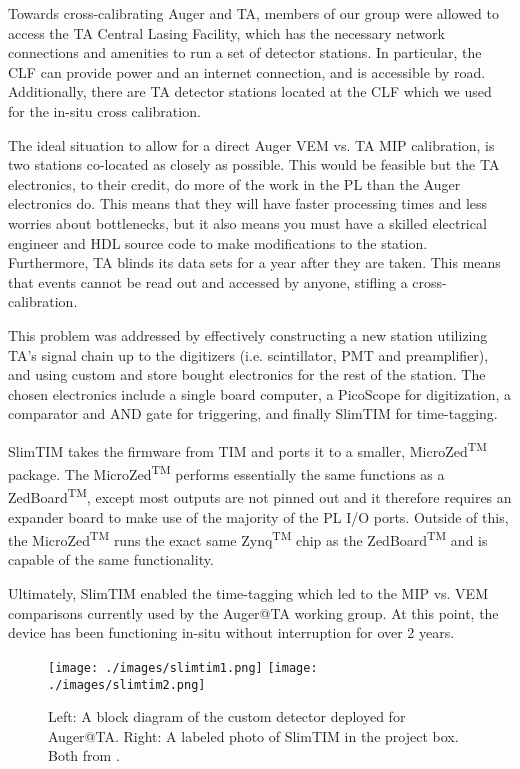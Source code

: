 Towards cross-calibrating Auger and TA, members of our group were allowed to access the TA Central Lasing Facility, which has the necessary network connections and amenities to run a set of detector stations. In particular, the CLF can provide power and an internet connection, and is accessible by road. Additionally, there are TA detector stations located at the CLF which we used for the in-situ cross calibration. 

The ideal situation to allow for a direct Auger VEM vs. TA MIP calibration, is two stations co-located as closely as possible. This would be feasible but the TA electronics, to their credit, do more of the work in the PL than the Auger electronics do. This means that they will have faster processing times and less worries about bottlenecks, but it also means you must have a skilled electrical engineer and HDL source code to make modifications to the station. Furthermore, TA blinds its data sets for a year after they are taken. This means that events cannot be read out and accessed by anyone, stifling a cross-calibration. 

This problem was addressed by effectively constructing a new station utilizing TA's signal chain up to the digitizers (i.e. scintillator, PMT and preamplifier), and using custom and store bought electronics for the rest of the station. The chosen electronics include a single board computer, a PicoScope for digitization, a comparator and AND gate for triggering, and finally SlimTIM for time-tagging. 

SlimTIM takes the firmware from TIM and ports it to a smaller, MicroZed\textsuperscript{TM} package. The MicroZed\textsuperscript{TM} performs essentially the same functions as a ZedBoard\textsuperscript{TM}, except most outputs are not pinned out and it therefore requires an expander board to make use of the majority of the PL I/O ports. Outside of this, the MicroZed\textsuperscript{TM} runs the exact same Zynq\textsuperscript{TM} chip as the ZedBoard\textsuperscript{TM} and is capable of the same functionality. 

Ultimately, SlimTIM enabled the time-tagging which led to the MIP vs. VEM comparisons currently used by the Auger@TA working group. At this point, the device has been functioning in-situ without interruption for over 2 years. 
\begin{figure}[H]
\centering
\texttt{[image: ./images/slimtim1.png]}
\texttt{[image: ./images/slimtim2.png]}
\caption[Auger@TA: SlimTIM]{Left: A block diagram of the custom detector deployed for Auger@TA. Right: A labeled photo of SlimTIM in the project box. Both from \textcite{sean}.}
\label{augerta2}
\end{figure}

